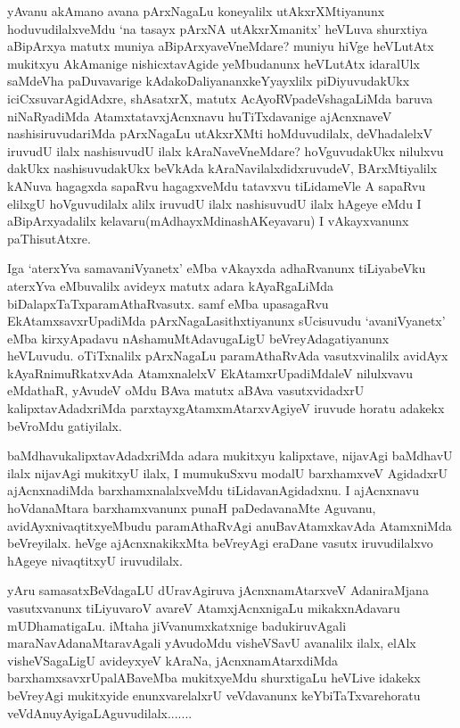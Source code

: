\begin{artha}
yAvanu akAmano avana pArxNagaLu koneyalilx utAkxrXMtiyanunx hoduvudilalxveMdu `na tasayx pArxNA utAkxrXmanitx' heVLuva shurxtiya aBipArxya matutx muniya aBipArxyaveVneMdare? muniyu hiVge heVLutAtx mukitxyu AkAmanige nishicxtavAgide yeMbudanunx heVLutAtx idaralUlx saMdeVha paDuvavarige kAdakoDaliyananxkeYyayxlilx piDiyuvudakUkx iciCxsuvarAgidAdxre, shAsatxrX, matutx AcAyoRVpadeVshagaLiMda baruva niNaRyadiMda AtamxtatavxjAcnxnavu huTiTxdavanige ajAcnxnaveV nashisiruvudariMda pArxNagaLu utAkxrXMti hoMduvudilalx, deVhadalelxV iruvudU ilalx nashisuvudU ilalx kAraNaveVneMdare? hoVguvudakUkx nilulxvu dakUkx nashisuvudakUkx beVkAda kAraNavilalxdidxruvudeV, BArxMtiyalilx kANuva hagagxda sapaRvu hagagxveMdu tatavxvu tiLidameVle A sapaRvu elilxgU hoVguvudilalx alilx iruvudU ilalx nashisuvudU ilalx hAgeye eMdu I aBipArxyadalilx kelavaru(mAdhayxMdinashAKeyavaru) I vAkayxvanunx paThisutAtxre.
\end{artha}

\begin{artha}
Iga `aterxYva samavaniVyanetx' eMba vAkayxda adhaRvanunx tiLiyabeVku aterxYva eMbuvalilx avideyx matutx adara kAyaRgaLiMda biDalapxTaTxparamAthaRvasutx. samf eMba upasagaRvu EkAtamxsavxrUpadiMda pArxNagaLasithxtiyanunx sUcisuvudu `avaniVyanetx' eMba kirxyApadavu nAshamuMtAdavugaLigU beVreyAdagatiyanunx heVLuvudu. oTiTxnalilx pArxNagaLu paramAthaRvAda vasutxvinalilx avidAyx kAyaRnimuRkatxvAda AtamxnalelxV EkAtamxrUpadiMdaleV nilulxvavu eMdathaR, yAvudeV oMdu BAva matutx aBAva vasutxvidadxrU kalipxtavAdadxriMda parxtayxgAtamxmAtarxvAgiyeV iruvude horatu adakekx beVroMdu gatiyilalx. 
\end{artha}


\begin{artha}
baMdhavukalipxtavAdadxriMda adara mukitxyu kalipxtave, nijavAgi baMdhavU ilalx nijavAgi mukitxyU ilalx, I mumukuSxvu modalU barxhamxveV AgidadxrU ajAcnxnadiMda barxhamxnalalxveMdu tiLidavanAgidadxnu. I ajAcnxnavu hoVdanaMtara barxhamxvanunx punaH paDedavanaMte Aguvanu, avidAyxnivaqtitxyeMbudu paramAthaRvAgi anuBavAtamxkavAda AtamxniMda beVreyilalx. heVge ajAcnxnakikxMta beVreyAgi eraDane vasutx iruvudilalxvo hAgeye nivaqtitxyU iruvudilalx.
\end{artha}

\begin{artha}
yAru samasatxBeVdagaLU dUravAgiruva jAcnxnamAtarxveV AdaniraMjana vasutxvanunx tiLiyuvaroV avareV AtamxjAcnxnigaLu mikakxnAdavaru mUDhamatigaLu. iMtaha jiVvanumxkatxnige badukiruvAgali maraNavAdanaMtaravAgali yAvudoMdu visheVSavU avanalilx ilalx, elAlx visheVSagaLigU avideyxyeV kAraNa, jAcnxnamAtarxdiMda barxhamxsavxrUpalABaveMba mukitxyeMdu shurxtigaLu heVLive idakekx beVreyAgi mukitxyide enunxvarelalxrU veVdavanunx keYbiTaTxvarehoratu veVdAnuyAyigaLAguvudilalx.......
\end{artha}

